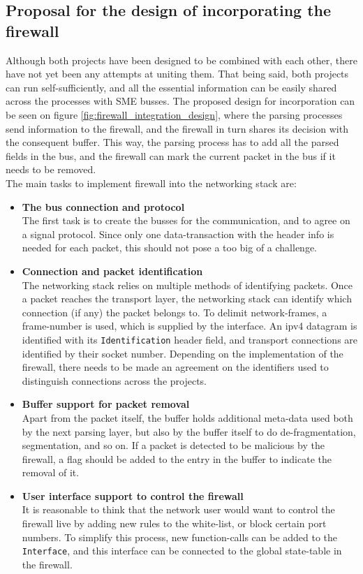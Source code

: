 \subsection{Proposal for the design of incorporating the firewall}
Although both projects have been designed to be combined with each other,
there have not yet been any attempts at uniting them.  That being said, both
projects can run self-sufficiently, and all the essential information can
be easily shared across the processes with SME busses.  The proposed design
for incorporation can be seen on figure \ref{fig:firewall_integration_design},
where the parsing processes send information to the firewall, and the firewall
in turn shares its decision with the consequent buffer. This way, the parsing
process has to add all the parsed fields in the bus, and the firewall can mark
the current packet in the bus if it needs to be removed.\\
The main tasks to implement firewall into the networking stack are:
\begin{itemize}
\item \textbf{The bus connection and protocol}\\
The first task is to create the busses for the communication, and to agree on
a signal protocol. Since only one data-transaction with the header info is
needed for each packet, this should not pose a too big of a challenge.

\item \textbf{Connection and packet identification}\\
The networking stack relies on multiple methods of identifying packets.
Once a packet reaches the transport layer, the networking stack can identify
which connection (if any) the packet belongs to. To delimit network-frames, a
frame-number is used, which is supplied by the interface. An \gls{ipv4}
datagram is identified with its \texttt{Identification} header field, and
transport connections are identified by their socket number.
Depending on the implementation of the firewall, there needs to be made an
agreement on the identifiers used to distinguish connections across the
projects.

\item \textbf{Buffer support for packet removal}\\
Apart from the packet itself, the buffer holds additional meta-data used both
by the next parsing layer, but also by the buffer itself to do
de-fragmentation, segmentation, and so on. If a packet is detected to be
malicious by the firewall, a flag should be added to the entry in the buffer to
indicate the removal of it.

\item \textbf{User interface support to control the firewall}\\
It is reasonable to think that the network user would want to control the
firewall live by adding new rules to the white-list, or block certain port
numbers. To simplify this process, new function-calls can be added to the
\texttt{Interface}, and this interface can be connected to the global
state-table in the firewall.
\end{itemize}



